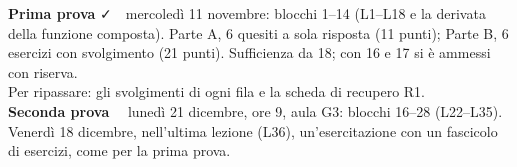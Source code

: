 \begin{tcbraster}
\begin{tcolorbox}[colframe=deri,colbacktitle=deri,title={\faPen\enspace Le due prove in itinere}]
\textbf{Prima prova} \textcolor{deri}{\faCheck}\ \ mercoledì 11 novembre: blocchi 1--14 (L1--L18 e la derivata della funzione composta). Parte A, 6 quesiti a sola risposta (11 punti); Parte B, 6 esercizi con svolgimento (21 punti). Sufficienza da 18; con 16 e 17 si è ammessi con riserva.\\[2pt]
Per ripassare: gli svolgimenti di ogni fila e la scheda di recupero R1.\\[4pt]
\textbf{Seconda prova} \textcolor{prob}{\clessidra}\ \ lunedì 21 dicembre, ore 9, aula G3: blocchi 16--28 (L22--L35). Venerdì 18 dicembre, nell'ultima lezione (L36), un'esercitazione con un fascicolo di esercizi, come per la prima prova.
\end{tcolorbox}
\end{tcbraster}

